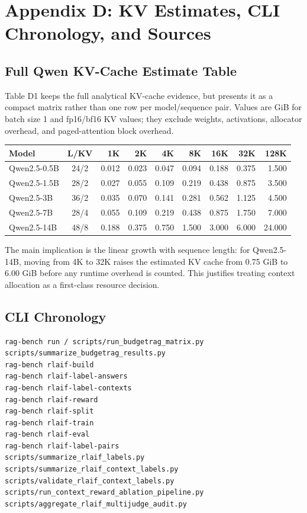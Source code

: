 \section{Appendix D: KV Estimates, CLI Chronology, and Sources}

\subsection{Full Qwen KV-Cache Estimate Table}

Table D1 keeps the full analytical KV-cache evidence, but presents it as a compact matrix rather than one row per model/sequence pair. Values are GiB for batch size 1 and fp16/bf16 KV values; they exclude weights, activations, allocator overhead, and paged-attention block overhead.

\begin{center}
\small
\setlength{\tabcolsep}{3.5pt}
\begin{tabular}{l c r r r r r r r}
\toprule
Model & L/KV & 1K & 2K & 4K & 8K & 16K & 32K & 128K \\
\midrule
Qwen2.5-0.5B & 24/2 & 0.012 & 0.023 & 0.047 & 0.094 & 0.188 & 0.375 & 1.500 \\
Qwen2.5-1.5B & 28/2 & 0.027 & 0.055 & 0.109 & 0.219 & 0.438 & 0.875 & 3.500 \\
Qwen2.5-3B & 36/2 & 0.035 & 0.070 & 0.141 & 0.281 & 0.562 & 1.125 & 4.500 \\
Qwen2.5-7B & 28/4 & 0.055 & 0.109 & 0.219 & 0.438 & 0.875 & 1.750 & 7.000 \\
Qwen2.5-14B & 48/8 & 0.188 & 0.375 & 0.750 & 1.500 & 3.000 & 6.000 & 24.000 \\
\bottomrule
\end{tabular}
\end{center}

The main implication is the linear growth with sequence length: for Qwen2.5-14B, moving from 4K to 32K raises the estimated KV cache from 0.75 GiB to 6.00 GiB before any runtime overhead is counted. This justifies treating context allocation as a first-class resource decision.

\subsection{CLI Chronology}

\begin{verbatim}
rag-bench run / scripts/run_budgetrag_matrix.py
scripts/summarize_budgetrag_results.py
rag-bench rlaif-build
rag-bench rlaif-label-answers
rag-bench rlaif-label-contexts
rag-bench rlaif-reward
rag-bench rlaif-split
rag-bench rlaif-train
rag-bench rlaif-eval
rag-bench rlaif-label-pairs
scripts/summarize_rlaif_labels.py
scripts/summarize_rlaif_context_labels.py
scripts/validate_rlaif_context_labels.py
scripts/run_context_reward_ablation_pipeline.py
scripts/aggregate_rlaif_multijudge_audit.py
\end{verbatim}


